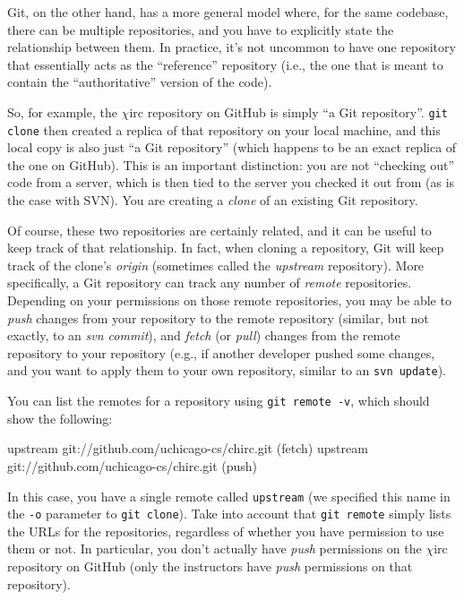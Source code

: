 \documentclass[10pt]{article}
\newcommand{\chirc}{$\chi$\textsf{irc} }
\newenvironment{example}%
{\VerbatimEnvironment\begin{Sbox}\begin{VerbExample}}%
{\end{VerbExample}\end{Sbox}\setlength{\fboxsep}{8pt}\begin{center}\fcolorbox{black}{backgroundgray}{\TheSbox}\end{center}}
\begin{document}
Git, on the other hand, has a more general model where, for the same codebase,  there can be multiple repositories, and you have to explicitly state the relationship between them. In practice, it's not uncommon to have one repository that essentially acts as the ``reference'' repository (i.e., the one that is meant to contain the ``authoritative'' version of the code).

So, for example, the \chirc repository on GitHub is simply ``a Git repository''. \texttt{git clone} then created a replica of that repository on your local machine, and this local copy is also just ``a Git repository'' (which happens to be an exact replica of the one on GitHub). This is an important distinction: you are not ``checking out'' code from a server, which is then tied to the server you checked it out from (as is the case with SVN). You are creating a \emph{clone} of an existing Git repository.

Of course, these two repositories are certainly related, and it can be useful to keep track of that relationship. In fact, when cloning a repository, Git will keep track of the clone's \emph{origin} (sometimes called the \emph{upstream} repository). More specifically, a Git repository can track any number of \emph{remote} repositories. Depending on your permissions on those remote repositories, you may be able to \emph{push} changes from your repository to the remote repository (similar, but not exactly, to an \emph{svn commit}), and \emph{fetch} (or \emph{pull}) changes from the remote repository to your repository (e.g., if another developer pushed some changes, and you want to apply them to your own repository, similar to an \texttt{svn update}). 

You can list the remotes for a repository using \texttt{git remote -v}, which should show the following:

\begin{example}
upstream	git://github.com/uchicago-cs/chirc.git (fetch)
upstream	git://github.com/uchicago-cs/chirc.git (push)
\end{example}

In this case, you have a single remote called \texttt{upstream} (we specified this name in the \texttt{-o} parameter to \texttt{git clone}). Take into account that \texttt{git remote} simply lists the URLs for the repositories, regardless of whether you have permission to use them or not. In particular, you don't actually have \emph{push} permissions on the \chirc repository on GitHub (only the instructors have \emph{push} permissions on that repository).  
\end{document}

